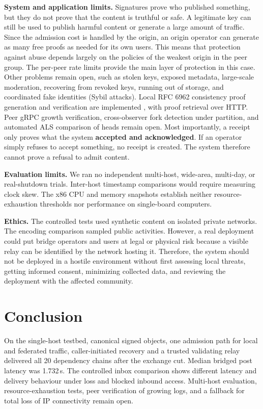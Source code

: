 \documentclass[conference,a4paper,10pt]{IEEEtran}
\begin{document}
\textbf{System and application limits.} Signatures prove who published something, but they do not prove that the content is truthful or safe. A legitimate key can still be used to publish harmful content or generate a large amount of traffic. Since the admission cost is handled by the origin, an origin operator can generate as many free proofs as needed for its own users. This means that protection against abuse depends largely on the policies of the weakest origin in the peer group. The per-peer rate limits provide the main layer of protection in this case. Other problems remain open, such as stolen keys, exposed metadata, large-scale moderation, recovering from revoked keys, running out of storage, and coordinated fake identities (Sybil attacks). Local RFC 6962 consistency proof generation and verification are implemented \cite{rfc6962}, with proof retrieval over HTTP. Peer gRPC growth verification, cross-observer fork detection under partition, and automated ALS comparison of heads remain open. Most importantly, a receipt only proves what the system \textbf{accepted and acknowledged}. If an operator simply refuses to accept something, no receipt is created. The system therefore cannot prove a refusal to admit content.

\textbf{Evaluation limits.} We ran no independent multi-host, wide-area, multi-day, or real-shutdown trials. Inter-host timestamp comparisons would require measuring clock skew. The x86 CPU and memory snapshots establish neither resource-exhaustion thresholds nor performance on single-board computers.

\textbf{Ethics.} The controlled tests used synthetic content on isolated private networks. The encoding comparison sampled public activities. However, a real deployment could put bridge operators and users at legal or physical risk because a visible relay can be identified by the network hosting it. Therefore, the system should not be deployed in a hostile environment without first assessing local threats, getting informed consent, minimizing collected data, and reviewing the deployment with the affected community.

\section{Conclusion}

On the single-host testbed, canonical signed objects, one admission path for local and federated traffic, caller-initiated recovery and a trusted validating relay delivered all 20 dependency chains after the exchange cut. Median bridged post latency was 1.732\,s. The controlled inbox comparison shows different latency and delivery behaviour under loss and blocked inbound access. Multi-host evaluation, resource-exhaustion tests, peer verification of growing logs, and a fallback for total loss of IP connectivity remain open.



\end{document}
